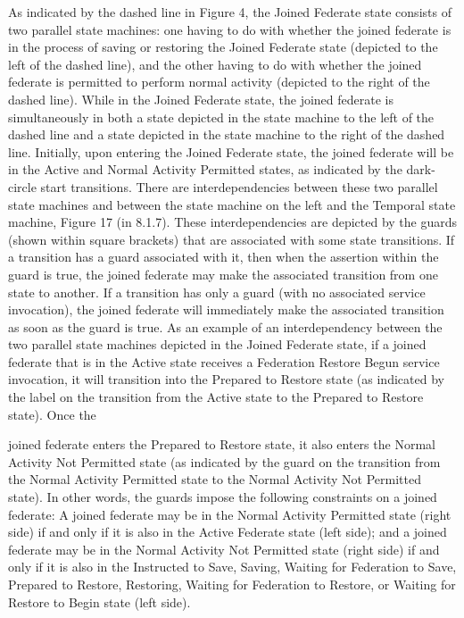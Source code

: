 As indicated by the dashed line in Figure 4, the Joined Federate state consists of two parallel state machines: one having to do with whether the joined federate is in the process of saving or restoring the Joined Federate state (depicted to the left of the dashed line), and the other having to do with whether the joined federate is permitted to perform normal activity (depicted to the right of the dashed line). While in the Joined Federate state, the joined federate is simultaneously in both a state depicted in the state machine to the left of the dashed line and a state depicted in the state machine to the right of the dashed line. Initially, upon entering the Joined Federate state, the joined federate will be in the Active and Normal Activity Permitted states, as indicated by the dark-circle start transitions. There are interdependencies between these two parallel state machines and between the state machine on the left and the Temporal state machine, Figure 17 (in 8.1.7). These interdependencies are depicted by the guards (shown within square brackets) that are associated with some state transitions. If a transition has a guard associated with it, then when the assertion within the guard is true, the joined federate may make the associated transition from one state to another. If a transition has only a guard (with no associated service invocation), the joined federate will immediately make the associated transition as soon as the guard is true. As an example of an interdependency between the two parallel state machines depicted in the Joined Federate state, if a joined federate that is in the Active state receives a Federation Restore Begun \rtiinitiated{} service invocation, it will transition into the Prepared to Restore state (as indicated by the label on the transition from the Active state to the Prepared to Restore state). Once the


\clearpage

joined federate enters the Prepared to Restore state, it also enters the Normal Activity Not Permitted state (as indicated by the guard on the transition from the Normal Activity Permitted state to the Normal Activity Not Permitted state). In other words, the guards impose the following constraints on a joined federate: A joined federate may be in the Normal Activity Permitted state (right side) if and only if it is also in the Active Federate state (left side); and a joined federate may be in the Normal Activity Not Permitted state (right side) if and only if it is also in the Instructed to Save, Saving, Waiting for Federation to Save, Prepared to Restore, Restoring, Waiting for Federation to Restore, or Waiting for Restore to Begin state (left side).

